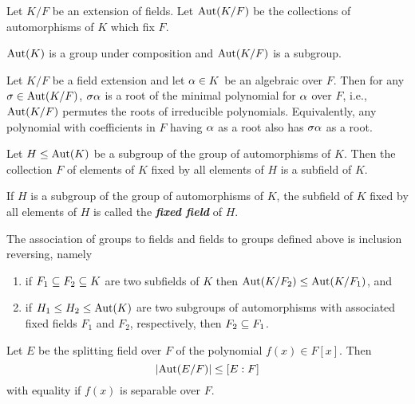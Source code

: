 \nl

\begin{defn}
Let $K/F$ be an extension of fields. Let $\text{Aut}(K/F)$ be the collections of automorphisms of $K$ which fix $F$.
\end{defn}

\nl

\begin{prop}
$\text{Aut}(K)$ is a group under composition and $\text{Aut}(K/F)$ is a subgroup.
\end{prop}

\nl

\begin{prop}
Let $K/F$ be a field extension and let $\alpha \in K$ be an algebraic over $F$. Then for any $\sigma\in \text{Aut}(K/F)$, $\sigma\alpha$ is a root of the minimal polynomial for $\alpha$ over $F$, i.e., $\text{Aut}(K/F)$ permutes the roots of irreducible polynomials. Equivalently, any polynomial with coefficients in $F$ having $\alpha$ as a root also has $\sigma\alpha$ as a root.
\end{prop}

\nl

\begin{prop}
Let $H\leq \text{Aut}(K)$ be a subgroup of the group of automorphisms of $K$. Then the collection $F$ of elements of $K$ fixed by all elements of $H$ is a subfield of $K$.
\end{prop}

\nl

\begin{defn}
If $H$ is a subgroup of the group of automorphisms of $K$, the subfield of $K$ fixed by all elements of $H$ is called the \textit{\textbf{fixed field}} of $H$.
\end{defn}

\nl

\begin{prop}
The association of groups to fields and fields to groups defined above is inclusion reversing, namely
\begin{enumerate}
\item if $F_1\subseteq F_2\subseteq K$ are two subfields of $K$ then $\text{Aut}(K/F_2)\leq \text{Aut}(K/F_1)$, and
\item if $H_1\leq H_2\leq \text{Aut}(K)$ are two subgroups of automorphisms with associated fixed fields $F_1$ and $F_2$, respectively, then $F_2\subseteq F_1$.
\end{enumerate}
\end{prop}

\nl

\begin{prop}
Let $E$ be the splitting field over $F$ of the polynomial $f(x)\in F[x]$. Then 
\[|\text{Aut}(E/F)|\leq [E:F]\]
with equality if $f(x)$ is separable over $F$.
\end{prop}

